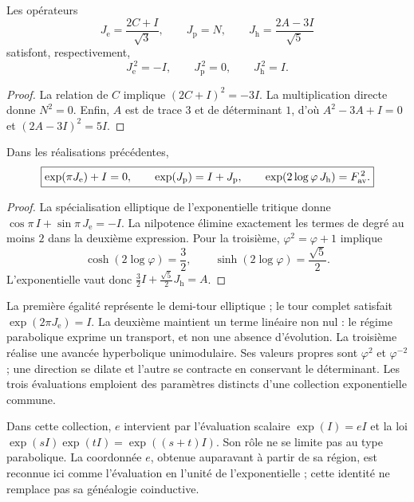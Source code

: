 \begin{proposition}
\label{geo-euler-trit-generadores}
Les opérateurs
\[
 J_{\mathrm e}=\frac{2C+I}{\sqrt3},\qquad
 J_{\mathrm p}=N,\qquad
 J_{\mathrm h}=\frac{2A-3I}{\sqrt5}
\]
satisfont, respectivement,
\[
 J_{\mathrm e}^{\,2}=-I,\qquad
 J_{\mathrm p}^{\,2}=0,\qquad
 J_{\mathrm h}^{\,2}=I.
\]
\end{proposition}
\begin{proof}
La relation de \(C\) implique \((2C+I)^2=-3I\).
La multiplication directe donne \(N^2=0\).
Enfin, \(A\) est de trace \(3\) et de déterminant \(1\), d’où
\(A^2-3A+I=0\) et \((2A-3I)^2=5I\).
\end{proof}

\begin{proposition}
\label{geo-euler-trit-evaluaciones}
Dans les réalisations précédentes,
\begin{equation}
 \boxed{
 \exp(\pi J_{\mathrm e})+I=0,\qquad
 \exp(J_{\mathrm p})=I+J_{\mathrm p},\qquad
 \exp(2\log\varphi\,J_{\mathrm h})=F_{\rm av}^{\,2}.}
 \label{geo-euler-trit-tres-evaluaciones}
\end{equation}
\end{proposition}
\begin{proof}
La spécialisation elliptique de l’exponentielle tritique donne
\(\cos\pi\,I+\sin\pi\,J_{\mathrm e}=-I\).
La nilpotence élimine exactement les termes de degré au moins \(2\)
dans la deuxième expression. Pour la troisième, \(\varphi^2=\varphi+1\) implique
\[
 \cosh(2\log\varphi)=\frac32,\qquad
 \sinh(2\log\varphi)=\frac{\sqrt5}{2}.
\]
L’exponentielle vaut donc
\(\frac32I+\frac{\sqrt5}{2}J_{\mathrm h}=A\).
\end{proof}

La première égalité représente le demi-tour elliptique ; le tour complet
satisfait \(\exp(2\pi J_{\mathrm e})=I\). La deuxième maintient un terme
linéaire non nul : le régime parabolique exprime un transport, et non une absence
d'évolution. La troisième réalise une avancée hyperbolique unimodulaire. Ses
valeurs propres sont \(\varphi^2\) et \(\varphi^{-2}\) ; une direction se dilate et
l'autre se contracte en conservant le déterminant. Les trois évaluations
emploient des paramètres distincts d'une collection exponentielle commune.

Dans cette collection, \(e\) intervient par l'évaluation scalaire
\(\exp(I)=eI\) et la loi \(\exp(sI)\exp(tI)=\exp((s+t)I)\).
Son rôle ne se limite pas au type parabolique. La coordonnée \(e\), obtenue
auparavant à partir de sa région, est reconnue ici comme l'évaluation en l'unité
de l'exponentielle ; cette identité ne remplace pas sa généalogie coinductive.

